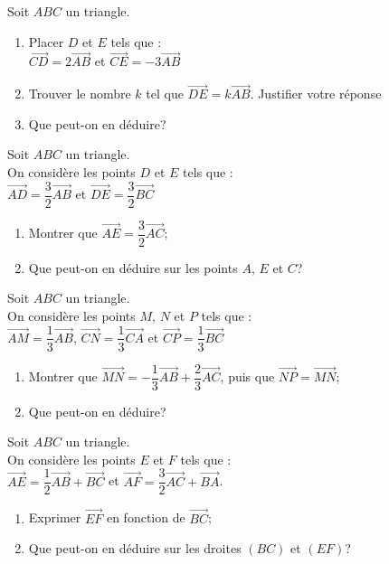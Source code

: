 \begin{exercice}
Soit $ABC$ un triangle.
\begin{enumerate}
	\item Placer $D$ et $E$ tels que :\\
$\overrightarrow{CD}=2\overrightarrow{AB}$ et $\overrightarrow{CE}=-3\overrightarrow{AB}$
\item Trouver le nombre $k$ tel que $\overrightarrow{DE}=k\overrightarrow{AB}$. Justifier votre réponse
\item Que peut-on en déduire?
\end{enumerate}
\end{exercice} 

\begin{exercice}
Soit $ABC$ un triangle.\\
On considère les points $D$ et $E$ tels que :\\
$\overrightarrow{AD}=\dfrac{3}{2}\overrightarrow{AB}$ et $\overrightarrow{DE}=\dfrac{3}{2}\overrightarrow{BC}$
\begin{enumerate}
\item Montrer que $\overrightarrow{AE}=\dfrac{3}{2}\overrightarrow{AC}$;
\item Que peut-on en déduire sur les points $A$, $E$ et $C$?
\end{enumerate}
\end{exercice} 

\begin{exercice}
Soit $ABC$ un triangle.\\
On considère les points $M$, $N$ et $P$ tels que :\\
$\overrightarrow{AM}=\dfrac{1}{3}\overrightarrow{AB}$, $\overrightarrow{CN}=\dfrac{1}{3}\overrightarrow{CA}$ et $\overrightarrow{CP}=\dfrac{1}{3}\overrightarrow{BC}$
\begin{enumerate}
\item Montrer que $\overrightarrow{MN}=-\dfrac{1}{3}\overrightarrow{AB}+\dfrac{2}{3}\overrightarrow{AC}$, puis que $\overrightarrow{NP}=\overrightarrow{MN}$;
\item Que peut-on en déduire?
\end{enumerate}
\end{exercice} 

\begin{exercice}
Soit $ABC$ un triangle.\\
On considère les points $E$ et $F$ tels que :\\
$\overrightarrow{AE}=\dfrac{1}{2}\overrightarrow{AB}+\overrightarrow{BC}$ et $\overrightarrow{AF}=\dfrac{3}{2}\overrightarrow{AC}+\overrightarrow{BA}$.
\begin{enumerate}
\item Exprimer $\overrightarrow{EF}$ en fonction de $\overrightarrow{BC}$;
\item Que peut-on en déduire sur les droites $(BC)$ et $(EF)$?
\end{enumerate}
\end{exercice} 

